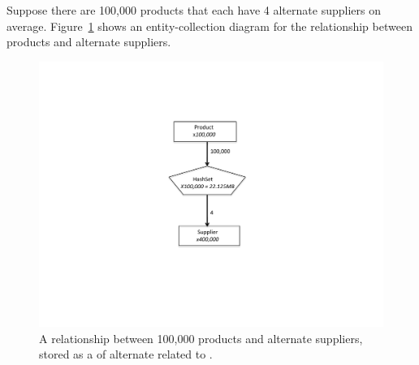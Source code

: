 
Suppose there are 100,000 products that each have 4 alternate suppliers on
average. Figure~\ref{fig:product-hashset} shows an entity-collection diagram for
the relationship between products and alternate suppliers.
 \begin{figure}
  \centering
 \includegraphics[width=.80\textwidth]{part1/Figures/collections/product-hashset.pdf}
 \caption{A relationship between 100,000 products and alternate suppliers,
  stored as a
   of alternate  related to .}
  \label{fig:product-hashset}
\end{figure}


%
%

